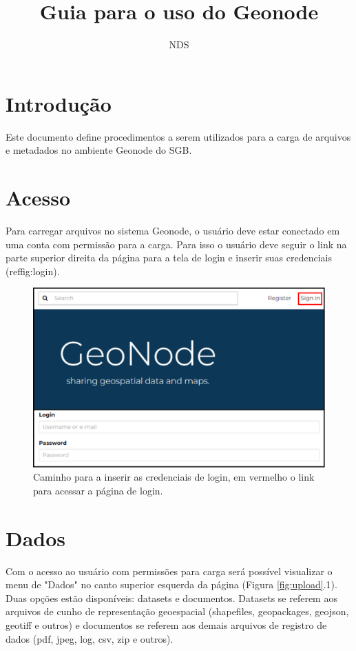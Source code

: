 \documentclass[12pt]{article}
\title{Guia para o uso do Geonode}
\author{NDS\inst{1}}
\begin{document}
 

\maketitle


\section{Introdução}

Este documento define procedimentos a serem utilizados para a carga de arquivos
e metadados no ambiente Geonode do SGB.

\section{Acesso} \label{sec:firstpage}

Para carregar arquivos no sistema Geonode, o usuário deve estar conectado em
uma conta com permissão para a carga. Para isso o usuário deve seguir o link na
parte superior direita da página para a tela de login e inserir suas
credenciais (ref{fig:login}).

\begin{figure}[h]
  \centering
  \includegraphics[width=\textwidth, keepaspectratio]{img/login.pdf}
  \caption{Caminho para a inserir as credenciais de login, em vermelho o link para acessar a página de login.}
  \label{fig:login}
\end{figure}


\section{Dados}

Com o acesso ao usuário com permissões para carga será possível visualizar o
menu de "Dados" no canto superior esquerda da página (Figura
\ref{fig:upload}.1). Duas opções estão disponíveis: datasets e documentos.
Datasets se referem aos arquivos de cunho de representação geoespacial
(shapefiles, geopackages, geojson, geotiff e outros) e documentos se referem
aos demais arquivos de registro de dados (pdf, jpeg, log, csv, zip e outros).
\end{document}
